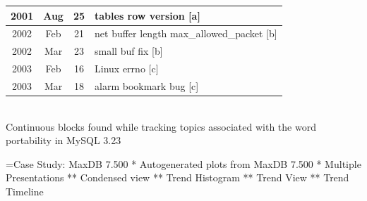 \documentclass[titlepage,usenames,a4,landscape,semhelv]{seminar}
\begin{document}
\begin{slide}
\begin{specquotef}
\begin{tabular}{|ccc|l|}
2001 &  Aug &  25 &    tables row version [a] \\
\hline
\hline
2002 &  Feb &  21 &    net buffer length  max\_allowed\_packet [b] \\
2002 &  Mar &  23 &    small buf fix [b]  \\
\hline
\hline
2003 &  Feb &  16 &    Linux errno  [c] \\
2003 &  Mar &  18 &    alarm bookmark bug [c] \\
\hline
\end{tabular} \\
{Continuous blocks found while tracking topics associated with the word portability in MySQL 3.23}
\label{tab:portability}
\end{specquotef}








=Case Study: MaxDB 7.500
* Autogenerated plots from MaxDB 7.500
* Multiple Presentations
** Condensed view
** Trend Histogram 
** Trend View
** Trend Timeline



\end{slide}
\end{document}
